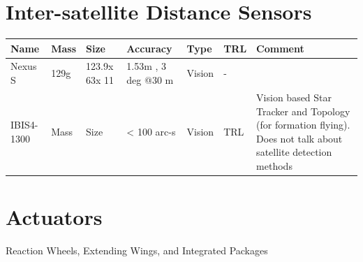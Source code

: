 \documentclass[english]{article}
\begin{document}
\section{Inter-satellite Distance Sensors}


\begin{center}
     \begin{tabular}{ |p{2cm} | l | l | l | l | l | p{5cm} |}
     \hline

      {\bf Name} & {\bf Mass} & {\bf Size} & {\bf Accuracy} & {\bf Type} & {\bf TRL} & {\bf Comment}  \\ \hline

     Nexus S \cite{Ref:ids2} & 129g & 123.9x 63x 11 & 1.53m , 3 deg @30 m & Vision & -  &   \\ \hline

     IBIS4-1300 \cite{Ref:ids1} & Mass & Size & < 100 arc-s & Vision & TRL & Vision based Star Tracker and Topology (for formation flying). Does not talk about satellite detection methods \\ \hline
     \end{tabular}
\end{center}


\section{Actuators}

Reaction Wheels, Extending Wings, and Integrated Packages\\
\end{document}
